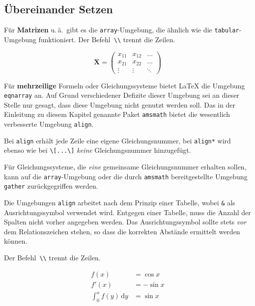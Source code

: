 \subsection{Übereinander Setzen}

Für \textbf{Matrizen} u.\,ä.\ gibt es die
\texttt{array}-Umgebung, die ähnlich wie die
\texttt{tabular}-Umgebung funktioniert.
Der Befehl~\lstinline|\\| trennt die Zeilen.

\begin{LTXexample}
\[
\mathbf{X} =
\left( \begin{array}{ccc}
x_{11} & x_{12} & \ldots \\
x_{21} & x_{22} & \ldots \\
\vdots & \vdots & \ddots
\end{array} \right)
\]
\end{LTXexample}


Für \textbf{mehrzeilige} Formeln oder Gleichungssysteme bietet \LaTeX{} die
Umgebung \texttt{eqnarray} an. Auf Grund verschiedener Defizite dieser
Umgebung sei an dieser Stelle nur gesagt, dass diese Umgebung nicht genutzt
werden soll. Das in der Einleitung zu diesem Kapitel genannte Paket
\texttt{amsmath} bietet die wesentlich verbesserte Umgebung \texttt{align}.

Bei \texttt{align} erhält jede Zeile eine eigene
Gleichungsnummer, bei \texttt{align*} wird ebenso wie bei
\lstinline|\[...\]| \emph{keine} Gleichungsnummer hinzugefügt.

Für Gleichungssysteme, die \emph{eine} gemeinsame Gleichungsnummer
erhalten sollen, kann auf die \texttt{array}-Umgebung oder die durch \texttt{amsmath}
bereitgestellte Umgebung \texttt{gather} zurückgegriffen werden.

Die Umgebungen \texttt{align} arbeitet nach dem Prinzip einer Tabelle, wobei \texttt{\&} als
Ausrichtungssymbol verwendet wird. Entgegen einer Tabelle, muss die Anzahl der Spalten nicht vorher
angegeben werden. Das Ausrichtungssymbol sollte stets \emph{vor} dem Relationszeichen stehen, so
dass die korrekten Abstände ermittelt werden können.

Der Befehl~\lstinline|\\| trennt die Zeilen.
\begin{LTXexample}
\begin{align}
f(x) & =  \cos x       \\
f'(x) & =  -\sin x     \\
\int_{0}^{x} f(y)\,\mathrm{d}y &
 =  \sin x
\end{align}
\end{LTXexample}



